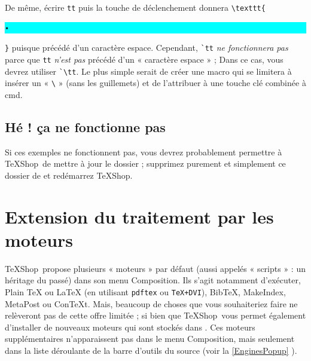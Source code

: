 \documentclass[11pt,french]{article}
\newcommand{\TS}{\textsf{\TeX Shop}}
\newcommand{\mnu}[1]{\textsf{#1}}
\newcommand{\selmark}{\colorbox{cyan}{\rule[-0.5ex]{0ex}{2.1ex}\texttt{•}}}
\begin{document}

De même, écrire \verb+tt+ puis la touche de déclenchement donnera \verb+\texttt{+\selmark\verb+}+ puisque précédé d'un caractère espace. Cependant, \verb+`tt+ \emph{ne fonctionnera pas} parce que \verb+tt+ \emph{n'est pas} précédé d'un « caractère espace » ; Dans ce cas, vous devrez utiliser \verb+`\tt+. Le plus simple serait de créer une macro qui se limitera à insérer un « \verb+\+ » (sans les guillemets) et de l'attribuer à une touche clé combinée à \mnu{cmd}.

\subsection{Hé ! ça ne fonctionne pas}

Si ces exemples ne fonctionnent pas, vous devrez probablement permettre à \TS\ de mettre à jour le dossier  ; supprimez purement et simplement ce dossier de  et redémarrez \TS.



\section{Extension du traitement par les moteurs}

\TS\ propose plusieurs « moteurs » par défaut (aussi appelés « scripts » : un héritage du passé) dans son menu \mnu{Composition}. Ils s'agit notamment d'exécuter, \mnu{Plain TeX} ou \mnu{LaTeX} (en utilisant \texttt{pdftex} ou \texttt{TeX+DVI}), \mnu{BibTeX},  \mnu{MakeIndex}, \mnu{MetaPost} ou \mnu{ConTeXt}. Mais, beaucoup de choses que vous souhaiteriez faire ne relèveront pas de cette offre limitée ; si bien que \TS\ vous permet également d'installer de nouveaux moteurs qui sont stockés dans . Ces moteurs supplémentaires n'apparaissent pas dans le menu \mnu{Composition}, mais seulement dans la liste déroulante de la barre d'outils du source (voir la \cref{EnginesPopup} ).
\end{document}
